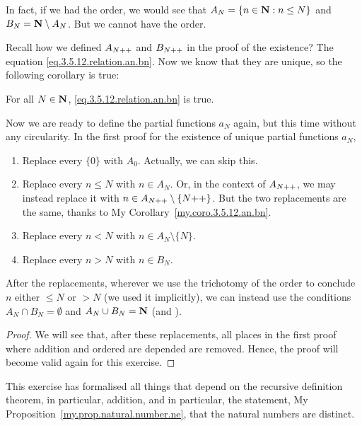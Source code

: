 In fact, if we had the order, we would see that $A_N = \{n \in \mathbf{N} : n \le N\}$ and $B_N = \mathbf{N} \setminus A_N$. But we cannot have the order.

Recall how we defined $A_{N{+}{+}}$ and $B_{N{+}{+}}$ in the proof of the existence? The equation \eqref{eq.3.5.12.relation.an.bn}. Now we know that they are unique, so the following corollary is true: 
\begin{coro}\label{my.coro.3.5.12.an.bn}
	For all $N \in \mathbf{N}$, \eqref{eq.3.5.12.relation.an.bn} is true.
\end{coro}

Now we are ready to define the partial functions $a_N$ again, but this time without any circularity. In the first proof for the existence of unique partial functions $a_N$,
\begin{enumerate}
	\item Replace every $\{0\}$ with $A_0$. Actually, we can skip this.
	\item Replace every $n \le N$ with $n \in A_N$. Or, in the context of $A_{N{+}{+}}$, we may instead replace it with $n \in A_{N{+}{+}}\setminus \{N{+}{+}\}$. But the two replacements are the same, thanks to My Corollary~\ref{my.coro.3.5.12.an.bn}.
	\item Replace every $n < N$ with $n \in A_N \setminus \{N\}$.
	\item Replace every $n > N$ with $n \in B_N$.
\end{enumerate}
After the replacements, wherever we use the trichotomy of the order to conclude $n$ either $\le N$ or $>N$ (we used it implicitly), we can instead use the conditions $A_N \cap B_N = \emptyset$ and $A_N \cup B_N = \mathbf{N}$ (and ).

\begin{proof}
	We will see that, after these replacements, all places in the first proof where addition and ordered are depended are removed. Hence, the proof will become valid again for this exercise.
\end{proof}

This exercise has formalised all things that depend on the recursive definition theorem, in particular, addition, and in particular, the statement, My Proposition~\ref{my.prop.natural.number.ne}, that the natural numbers are distinct.

